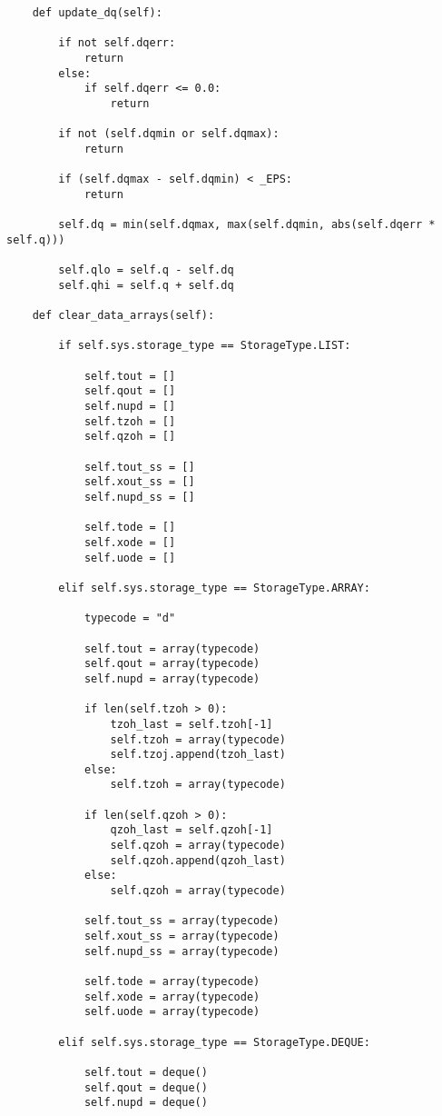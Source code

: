 \begin{lstlisting}
    def update_dq(self):

        if not self.dqerr:
            return
        else:
            if self.dqerr <= 0.0:
                return

        if not (self.dqmin or self.dqmax):
            return

        if (self.dqmax - self.dqmin) < _EPS:
            return

        self.dq = min(self.dqmax, max(self.dqmin, abs(self.dqerr * self.q)))

        self.qlo = self.q - self.dq
        self.qhi = self.q + self.dq

    def clear_data_arrays(self):

        if self.sys.storage_type == StorageType.LIST:

            self.tout = []
            self.qout = []
            self.nupd = []
            self.tzoh = []
            self.qzoh = []

            self.tout_ss = []
            self.xout_ss = []
            self.nupd_ss = []

            self.tode = []
            self.xode = []
            self.uode = []

        elif self.sys.storage_type == StorageType.ARRAY:

            typecode = "d"

            self.tout = array(typecode)
            self.qout = array(typecode)
            self.nupd = array(typecode)

            if len(self.tzoh > 0):
                tzoh_last = self.tzoh[-1]
                self.tzoh = array(typecode)
                self.tzoj.append(tzoh_last)
            else:
                self.tzoh = array(typecode)

            if len(self.qzoh > 0):
                qzoh_last = self.qzoh[-1]
                self.qzoh = array(typecode)
                self.qzoh.append(qzoh_last)
            else:
                self.qzoh = array(typecode)

            self.tout_ss = array(typecode)
            self.xout_ss = array(typecode)
            self.nupd_ss = array(typecode)

            self.tode = array(typecode)
            self.xode = array(typecode)
            self.uode = array(typecode)

        elif self.sys.storage_type == StorageType.DEQUE:

            self.tout = deque()
            self.qout = deque()
            self.nupd = deque()
            

\end{lstlisting}

